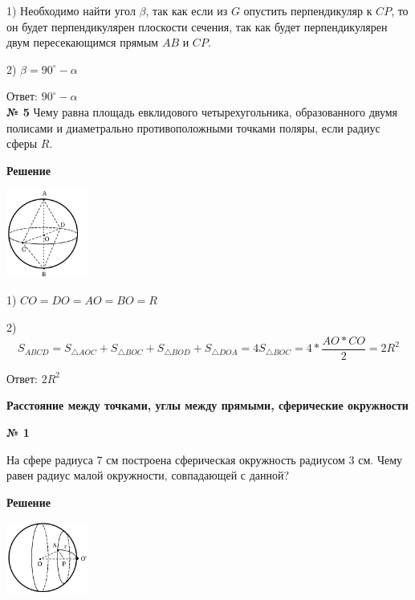     1) Необходимо найти угол $\beta$, так как если из $G$ опустить перпендикуляр к $CP$, то он будет перпендикулярен
    плоскости сечения, так как будет перпендикулярен двум пересекающимся прямым $AB$ и $CP$.

    2) $\beta = 90^\circ - \alpha$

    Ответ: $90^\circ - \alpha$\\


    \textbf{№ 5}
    Чему равна площадь евклидового четырехугольника, образованного двумя полисами и диаметрально противоположными точками поляры,
    если радиус сферы $R$.

    \textbf{Решение}\\

    \begin{center}
        \includegraphics[width=0.2\textwidth]{images/img42}\\
    \end{center}

    1) $CO = DO = AO = BO = R$

    2)
    \[
        S_{ABCD} = S_{\triangle AOC} + S_{\triangle BOC} + S_{\triangle BOD} + S_{\triangle DOA} = 4 S_{\triangle BOC} = 4 * \frac{AO * CO}{2} = 2R^2
    \]

    Ответ: $2R^2$\\


    \begin{center}
        \textbf{Расстояние между точками, углы между прямыми, сферические окружности}
    \end{center}

    \begin{center}
        \textbf{№ 1}
    \end{center}

    На сфере радиуса 7 см построена сферическая окружность радиусом 3 см.
    Чему равен радиус малой окружности, совпадающей с данной?

    \textbf{Решение}\\

    \begin{center}
        \includegraphics[width=0.2\textwidth]{images/img43}\\
    \end{center}

